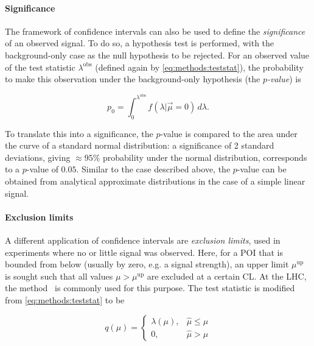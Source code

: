 \paragraph{Significance}

The framework of confidence intervals can also be used to define the \textit{significance} of an observed signal. To do so, a hypothesis test is performed, with the background-only case as the null hypothesis to be rejected. For an observed value of the test statistic $\lambda^{\mathrm{obs}}$ (defined again by \cref{eq:methods:teststat}), the probability to make this observation under the background-only hypothesis (the \textit{$p$-value}) is

\begin{equation}
\label{eq:methods:pvalue}
    p_0 = \int_0^{\lambda^{\mathrm{obs}}} f(\lambda | \vec{\mu} = 0) \, d\lambda.
\end{equation}

To translate this into a significance, the $p$-value is compared to the area under the curve of a standard normal distribution: a significance of 2 standard deviations, giving $\approx 95\%$ probability under the normal distribution, corresponds to a $p$-value of $0.05$. Similar to the case described above, the $p$-value can be obtained from analytical approximate distributions in the case of a simple linear signal.

\paragraph{Exclusion limits}

A different application of confidence intervals are \textit{exclusion limits}, used in experiments where no or little signal was observed. Here, for a POI that is bounded from below (usually by zero, e.g. a signal strength), an upper limit $\mu^{\mathrm{up}}$ is sought such that all values $\mu > \mu^{\mathrm{up}}$ are excluded at a certain CL. At the LHC, the \CLs method~\cite{Junk:1999kv,Read:2002hq} is commonly used for this purpose. The test statistic is modified from \cref{eq:methods:teststat} to be 

\begin{equation}
    q(\mu) = \begin{cases} 
        \lambda(\mu), & \hat{\mu} \leq \mu \\
        0, & \hat{\mu} > \mu
    \end{cases}
\end{equation}

